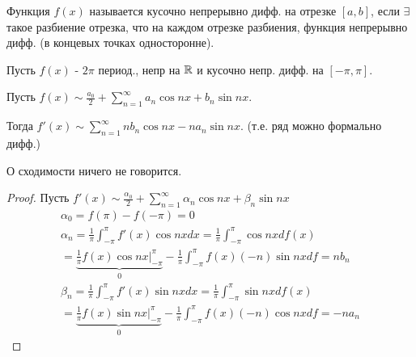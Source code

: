\documentclass{article}
\begin{document}
\begin{definition}
  Функция $f(x)$ называется кусочно непрерывно дифф. на отрезке $[a,b]$,
  если $\exists$ такое разбиение отрезка, что на каждом отрезке разбиения,
  функция непрерывно дифф. (в концевых точках односторонне).
\end{definition}
\begin{theorem}
  Пусть $f(x)$ - $2\pi$ период., непр на $\mathbb{R}$ и кусочно непр. дифф. на $[-\pi,\pi]$.

  Пусть $f(x) \sim \frac{a_0}{2}+\sum_{n=1}^{\infty}a_n\cos nx + b_n \sin nx$.

  Тогда $f'(x) \sim \sum_{n=1}^{\infty} nb_n\cos nx - na_n\sin nx$.
  (т.е. ряд можно формально дифф.)
\end{theorem}
\begin{remark}
  О сходимости ничего не говорится.
\end{remark}
\begin{proof}
  Пусть $f'(x)\sim \frac{\alpha_0}{2}+\sum_{n=1}^{\infty}\alpha_n\cos nx + \beta_n\sin nx$
  \begin{gather*}
    \alpha_0=f(\pi) - f(-\pi)= 0 \\ 
    \alpha_n=\frac{1}{\pi}\int_{-\pi}^{\pi}f'(x)\cos nx dx = \frac{1}{\pi}\int_{-\pi}^{\pi}\cos nx df(x) \\ 
    = \underbrace{\frac{1}{\pi}f(x)\cos nx \Big|_{-\pi}^{\pi}}_{0}- \frac{1}{\pi}\int_{-\pi}^{\pi}f(x)(-n)\sin nx df = nb_n \\
    \beta_n=\frac{1}{\pi}\int_{-\pi}^{\pi}f'(x)\sin nx dx = \frac{1}{\pi}\int_{-\pi}^{\pi}\sin nx df(x) \\ 
    = \underbrace{\frac{1}{\pi}f(x)\sin nx \Big|_{-\pi}^{\pi}}_{0}- \frac{1}{\pi}\int_{-\pi}^{\pi}f(x)(-n)\cos nx df = -na_n
  \end{gather*}
\end{proof}
\end{document}
